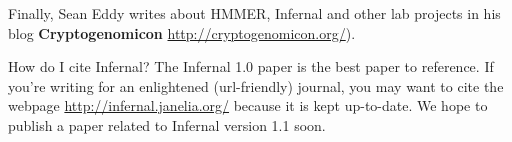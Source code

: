 Finally, Sean Eddy writes about HMMER, Infernal and other lab projects in
his blog \textbf{Cryptogenomicon} \url{http://cryptogenomicon.org/}).

\begin{srefaq}{How do I cite Infernal?}
The Infernal 1.0 paper \citep{Nawrocki09} is the best paper to
reference. If you're writing for an enlightened (url-friendly)
journal, you may want to cite the webpage
\url{http://infernal.janelia.org/} because it is kept up-to-date. 
We hope to publish a paper related to Infernal version 1.1 soon.
\end{srefaq}















  









